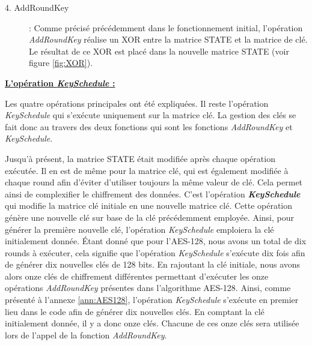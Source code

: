\documentclass[oneside]{book}
\begin{document}
\begin{description}
\item[4. AddRoundKey] : Comme précisé précédemment dans le fonctionnement initial, l'opération \textit{AddRoundKey} réalise un XOR entre la matrice STATE et la matrice de clé. Le résultat de ce XOR est placé dans la nouvelle matrice STATE (voir figure \ref{fig:XOR}).\\ 
\end{description}

\newpage
\underline{\textbf{L'opération \textit{KeySchedule} :}}

\vspace{0.1cm}Les quatre opérations principales ont été expliquées. Il reste l'opération \textit{KeySchedule} qui s'exécute uniquement sur la matrice clé. La gestion des clés se fait donc au travers des deux fonctions qui sont les fonctions \textit{AddRoundKey} et \textit{KeySchedule}.

\hspace{-0.5cm}Jusqu'à présent, la matrice STATE était modifiée après chaque opération exécutée. Il en est de même pour la matrice clé, qui est également modifiée à chaque round afin d'éviter d'utiliser toujours la même valeur de clé. Cela permet ainsi de complexifier le chiffrement des données. C'est l'opération \textbf{\textit{KeySchedule}} qui modifie la matrice clé initiale en une nouvelle matrice clé. Cette opération génère une nouvelle clé sur base de la clé précédemment employée. Ainsi, pour générer la première nouvelle clé, l'opération \textit{KeySchedule} emploiera la clé initialement donnée. Étant donné que pour l'AES-128, nous avons un total de dix rounds à exécuter, cela signifie que l'opération \textit{KeySchedule} s'exécute dix fois afin de générer dix nouvelles clés de 128 bits. En rajoutant la clé initiale, nous avons alors onze clés de chiffrement différentes permettant d'exécuter les onze opérations \textit{AddRoundKey} présentes dans l'algorithme AES-128. Ainsi, comme présenté à l'annexe \ref{ann:AES128}, l'opération \textit{KeySchedule} s'exécute en premier lieu dans le code afin de générer dix nouvelles clés. En comptant la clé initialement donnée, il y a donc onze clés. Chacune de ces onze clés sera utilisée lors de l'appel de la fonction \textit{AddRoundKey}. 
\end{document}

